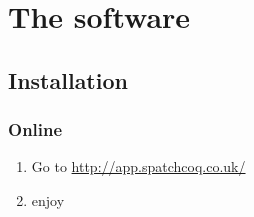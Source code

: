 \chapter{The software}\label{ch:thesoftware}
\section{ Installation}
\subsection{Online}


\begin{enumerate}
\item Go to  \url{http://app.spatchcoq.co.uk/}
\item enjoy
\end{enumerate}

